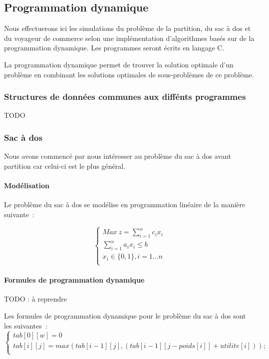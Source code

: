 \documentclass[a4paper, 12pt]{article}
\begin{document}
\subsection{Programmation dynamique}

Nous effectuerons ici les simulations du problème de la partition, du sac
à dos et du voyageur de commerce selon une implémentation
d'algorithmes basés sur de la programmation dynamique. Les programmes
seront écrits en langage C.

La programmation dynamique permet de trouver la solution optimale d'un
problème en combinant les solutions optimales de sous-problèmes de ce
problème.

\subsubsection{Structures de données communes aux diffénts programmes}

TODO

\subsubsection{Sac à dos}

Nous avons commencé par nous intéresser au problème du sac à dos avant
partition car celui-ci est le plus général.

\paragraph{Modélisation}

Le problème du sac à dos se modélise en programmation linéaire de la
manière suivante~:

\begin{equation}
\begin{cases}
Max~z=\sum_{i=1}^nc_ix_i \\
\sum_{i=1}^na_ix_i \leq b \\
x_i \in\{0, 1\}, i=1\dots n\\
\end{cases}
\end{equation}

\paragraph{Formules de programmation dynamique}

TODO : à reprendre

Les formules de programmation dynamique pour le problème du sac à dos
sont les suivantes~:
\begin{equation}
\begin{cases}
tab[0][w] = 0 \\
tab[i][j] = max(tab[i-1] [j], (tab[i-1] [j-poids[i]] + utilite[i])); \\
\end{cases}
\end{equation}
\end{document}
